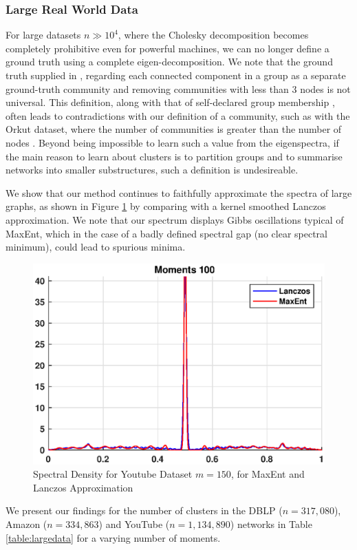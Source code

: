 \documentclass{article}
\begin{document}
\subsubsection{Large Real World Data}
For large datasets $n\gg10^{4}$, where the Cholesky decomposition becomes completely prohibitive even for powerful machines, we can no longer define a ground truth using a complete eigen-decomposition. We note that the ground truth supplied in \citep{mislove-2007-socialnetworks}, regarding each connected component in a group as a separate ground-truth community and removing communities with less than 3 nodes is not universal. This definition, along with that of self-declared group membership \citep{yang2015defining}, often leads to contradictions with our definition of a community, such as with the Orkut dataset, where the number of communities is greater than the number of nodes \citep{snapnets}. Beyond being impossible to learn such a value from the eigenspectra, if the main reason to learn about clusters is to partition groups and to summarise networks into smaller substructures, such a definition is undesireable.

We show that our method continues to faithfully approximate the spectra of large graphs, as shown in Figure \ref{fig:youtube150moments} by comparing with a kernel smoothed Lanczos approximation. We note that our spectrum displays Gibbs oscillations typical of MaxEnt, which in the case of a badly defined spectral gap (no clear spectral minimum), could lead to spurious minima.  
\begin{figure}	
	\centering
	\includegraphics[trim=1.0cm 0.9cm 1cm 0.8cm, clip, width=1.0\linewidth]{Figures/YoutubeDistributionat150moments}
	\caption{Spectral Density for Youtube Dataset $m=150$, for MaxEnt and Lanczos Approximation}
	\label{fig:youtube150moments}	
\end{figure} 
We present our findings for the number of clusters in the DBLP ($n=317,080$), Amazon ($n=334,863$) and YouTube ($n=1,134,890$) networks \citep{snapnets} in Table \ref{table:largedata} for a varying number of moments. 
\end{document}
